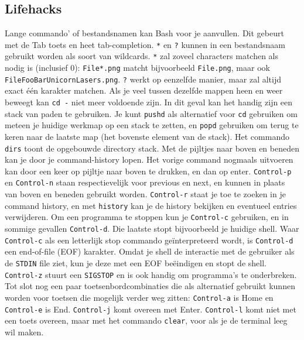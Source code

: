 \subsection{Lifehacks}\label{lifehacks}

Lange commando' of bestandsnamen kan Bash voor je aanvullen. Dit gebeurt met de Tab toets en heet tab-completion. \texttt{*} en \texttt{?} kunnen in een bestandsnaam gebruikt worden als soort van wildcards. \texttt{*} zal zoveel characters matchen als nodig is (inclusief 0): \texttt{File*.png} matcht bijvoorbeeld \texttt{File.png}, maar ook \texttt{FileFooBarUnicornLasers.png}. \texttt{?} werkt op eenzelfde manier, maar zal altijd exact één karakter matchen. Als je veel tussen dezelfde mappen heen en weer beweegt kan \texttt{cd\ -} niet meer voldoende zijn. In dit geval kan het handig zijn een stack van paden te gebruiken. Je kunt \texttt{pushd} als alternatief voor \texttt{cd} gebruiken om meteen je huidige werkmap op een stack te zetten, en \texttt{popd} gebruiken om terug te keren naar de laatste map (het bovenste element van de stack). Het commando \texttt{dirs} toont de opgebouwde directory stack. Met de pijltjes naar boven en beneden kan je door je command-history lopen. Het vorige command nogmaals uitvoeren kan door een keer op pijltje naar boven te drukken, en dan op enter. \texttt{Control-p} en \texttt{Control-n} staan respectievelijk voor previous en next, en kunnen in plaats van boven en beneden gebruikt worden. \texttt{Control-r} staat je toe te zoeken in je command history, en met \texttt{history} kan je de history bekijken en eventueel entries verwijderen. Om een programma te stoppen kun je \texttt{Control-c} gebruiken, en in sommige gevallen \texttt{Control-d}. Die laatste stopt bijvoorbeeld je huidige shell. Waar \texttt{Control-c} als een letterlijk stop commando geïnterpreteerd wordt, is \texttt{Control-d} een end-of-file (EOF) karakter. Omdat je shell de interactie met de gebruiker als de \texttt{STDIN} file ziet, kun je deze met een EOF beëindigen en stopt de shell. \texttt{Control-z} stuurt een \texttt{SIGSTOP} en is ook handig om programma's te onderbreken. Tot slot nog een paar toetsenbordcombinaties die als alternatief gebruikt kunnen worden voor toetsen die mogelijk verder weg zitten: \texttt{Control-a} is Home en \texttt{Control-e} is End. \texttt{Control-j} komt overeen met Enter. \texttt{Control-l} komt niet met een toets overeen, maar met het commando \texttt{clear}, voor als je de terminal leeg wil maken. 



